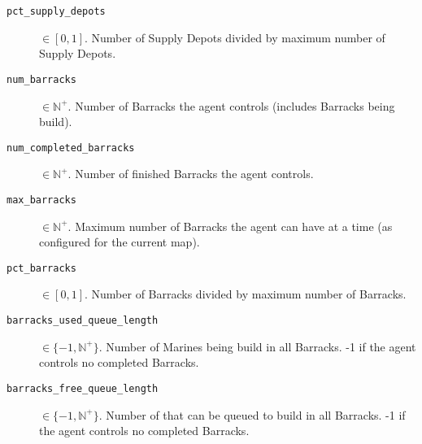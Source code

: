 \begin{description}
    \item[\texttt{pct\_supply\_depots}] $\in [0,1]$. Number of Supply Depots divided by maximum number of Supply Depots.
    \item[\texttt{num\_barracks}] $\in \mathbb{N}^+$. Number of Barracks the agent controls (includes Barracks being build).
    \item[\texttt{num\_completed\_barracks}] $\in \mathbb{N}^+$. Number of finished Barracks the agent controls.
    \item[\texttt{max\_barracks}] $\in \mathbb{N}^+$. Maximum number of Barracks the agent can have at a time (as configured for the current map).
    \item[\texttt{pct\_barracks}] $\in [0,1]$. Number of Barracks divided by maximum number of Barracks.
    \item[\texttt{barracks\_used\_queue\_length}] $\in \{-1, \mathbb{N}^+\}$. Number of Marines being build in all Barracks. -1 if the agent controls no completed Barracks.
    \item[\texttt{barracks\_free\_queue\_length}] $\in \{-1, \mathbb{N}^+\}$. Number of that can be queued to build in all Barracks. -1 if the agent controls no completed Barracks.
\end{description}

